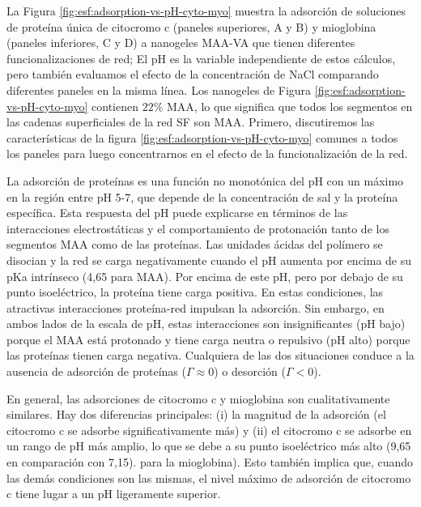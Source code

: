  
 La Figura \ref{fig:esf:adsorption-vs-pH-cyto-myo} muestra la adsorci\'on de soluciones de prote\'ina \'unica de citocromo c (paneles superiores, A y B) y mioglobina (paneles inferiores, C y D) a nanogeles MAA-VA que tienen diferentes funcionalizaciones de red;
 El pH es la variable independiente de estos c\'alculos, pero tambi\'en evaluamos el efecto de la concentraci\'on de NaCl comparando diferentes paneles en la misma l\'inea.
 Los nanogeles de Figura \ref{fig:esf:adsorption-vs-pH-cyto-myo} contienen $22\%$ MAA, lo que significa que todos los segmentos en las cadenas superficiales de la red SF son MAA.
 Primero, discutiremos las caracter\'isticas de la figura \ref{fig:esf:adsorption-vs-pH-cyto-myo} comunes a todos los paneles para luego concentrarnos en el efecto de la funcionalizaci\'on de la red.
 
 
 
 La adsorci\'on de prote\'inas es una funci\'on no monot\'onica del pH con un m\'aximo en la regi\'on entre pH 5-7, que depende de la concentraci\'on de sal y la prote\'ina espec\'ifica.
 Esta respuesta del pH puede explicarse en t\'erminos de las interacciones electrost\'aticas y el comportamiento de protonaci\'on tanto de los segmentos MAA como de las prote\'inas.
 Las unidades \'acidas del pol\'imero se disocian y la red se carga negativamente cuando el pH aumenta por encima de su pKa intr\'inseco (4,65 para MAA).
 Por encima de este pH, pero por debajo de su punto isoel\'ectrico, la prote\'ina tiene carga positiva.
 En estas condiciones, las atractivas interacciones prote\'ina-red impulsan la adsorci\'on.
 Sin embargo, en ambos lados de la escala de pH, estas interacciones son insignificantes (pH bajo) porque el MAA est\'a protonado y tiene carga neutra o repulsivo (pH alto) porque las prote\'inas tienen carga negativa.
 Cualquiera de las dos situaciones conduce a la ausencia de adsorci\'on de prote\'inas ($\Gamma\approx 0$) o desorci\'on ($\Gamma< 0$).
 
 
 
 En general, las adsorciones de citocromo c y mioglobina son cualitativamente similares.
 Hay dos diferencias principales: (i) la magnitud de la adsorci\'on (el citocromo c se adsorbe significativamente m\'as) y (ii) el citocromo c se adsorbe en un rango de pH m\'as amplio, lo que se debe a su punto isoel\'ectrico m\'as alto (9,65 en comparaci\'on con 7,15). para la mioglobina).
 Esto tambi\'en implica que, cuando las dem\'as condiciones son las mismas, el nivel m\'aximo de adsorci\'on de citocromo c tiene lugar a un pH ligeramente superior.
 
